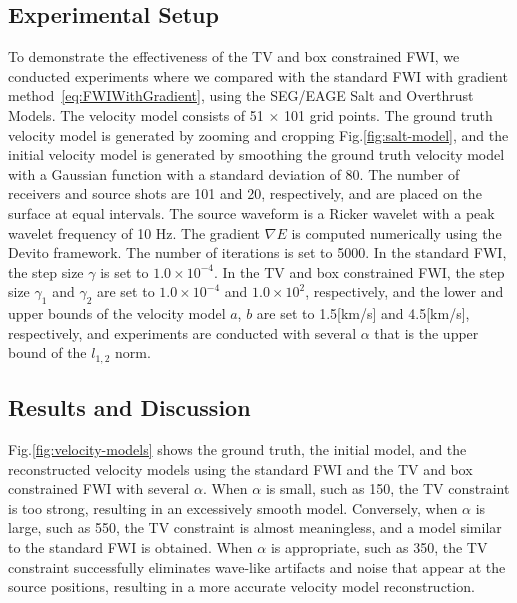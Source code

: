 \subsection{Experimental Setup}\label{subsec:experimental-setup}

To demonstrate the effectiveness of the TV and box constrained FWI, we conducted experiments where we compared with the standard FWI with gradient method~\eqref{eq:FWIWithGradient}, using the SEG/EAGE Salt and Overthrust Models.
The velocity model consists of 51 $\times$ 101 grid points.
The ground truth velocity model is generated by zooming and cropping Fig.\ref{fig:salt-model}, and the initial velocity model is generated by smoothing the ground truth velocity model with a Gaussian function with a standard deviation of 80.
The number of receivers and source shots are 101 and 20, respectively, and are placed on the surface at equal intervals.
The source waveform is a Ricker wavelet with a peak wavelet frequency of 10 Hz.
The gradient $\nabla E$ is computed numerically using the Devito framework\cite{devito}.
The number of iterations is set to 5000.
In the standard FWI, the step size $\gamma$ is set to $1.0 \times 10^{-4}$.
In the TV and box constrained FWI, the step size $\gamma_1$ and $\gamma_2$ are set to $1.0 \times 10^{-4}$ and $1.0 \times 10^2$, respectively,
    and the lower and upper bounds of the velocity model $a$, $b$ are set to 1.5[km/s] and 4.5[km/s], respectively,
    and experiments are conducted with several $\alpha$ that is the upper bound of the $l_{1,2}$ norm.


\subsection{Results and Discussion}\label{subsec:results-and-discussion}

Fig.\ref{fig:velocity-models} shows the ground truth, the initial model, and the reconstructed velocity models using the standard FWI and the TV and box constrained FWI with several $\alpha$.
When $\alpha$ is small, such as 150, the TV constraint is too strong, resulting in an excessively smooth model.
Conversely, when $\alpha$ is large, such as 550, the TV constraint is almost meaningless, and a model similar to the standard FWI is obtained.
When $\alpha$ is appropriate, such as 350, the TV constraint successfully eliminates wave-like artifacts and noise that appear at the source positions, resulting in a more accurate velocity model reconstruction.

